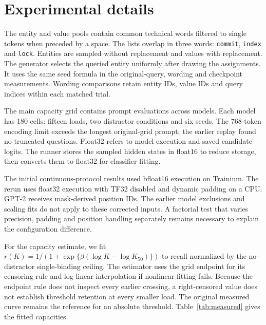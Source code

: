 \documentclass{article}
\begin{document}
\clearpage
\appendix
\section{Experimental details}\label{app:protocol}
The entity and value pools contain common technical words filtered to single tokens when preceded by a space.
The lists overlap in three words: \texttt{commit}, \texttt{index} and \texttt{lock}.
Entities are sampled without replacement and values with replacement.
The generator selects the queried entity uniformly after drawing the assignments.
It uses the same seed formula in the original-query, wording and checkpoint measurements.
Wording comparisons retain entity IDs, value IDs and query indices within each matched trial.

The main capacity grid contains \NewNPrompts{} prompt evaluations across \NewNModels{} models.
Each model has 180 cells: fifteen loads, two distractor conditions and six seeds.
The 768-token encoding limit exceeds the longest original-grid prompt; the earlier replay found no truncated questions.
Float32 refers to model execution and saved candidate logits.
The runner stores the sampled hidden states in float16 to reduce storage, then converts them to float32 for classifier fitting.

The initial continuous-protocol results used bfloat16 execution on Trainium.
The rerun uses float32 execution with TF32 disabled and dynamic padding on a CPU.
GPT-2 receives mask-derived position IDs.
The earlier model exclusions and scaling fits do not apply to these corrected inputs.
A factorial test that varies precision, padding and position handling separately remains necessary to explain the configuration difference.

For the capacity estimate, we fit
$r(K)=1/(1+\exp\{\beta(\log K-\log K_{50})\})$
to recall normalized by the no-distractor single-binding ceiling.
The estimator uses the grid endpoint for its censoring rule and log-linear interpolation if nonlinear fitting fails.
Because the endpoint rule does not inspect every earlier crossing, a right-censored value does not establish threshold retention at every smaller load.
The original measured curve remains the reference for an absolute threshold.
Table~\ref{tab:measured} gives the fitted capacities.

\begin{table}[t]
\centering
\caption{Corrected original-query measurements, with 576 trials per recall cell.
$p_0$ denotes recall without distractors; $p_D$ includes the code-like block.
Both fitted capacities normalize by $p_0(1)$.
$>64$ denotes an endpoint above the normalized half-recall criterion; $\leq1$ denotes failure at the first grid point under the interpolation fallback.
Capacities are descriptive fit outputs, not estimates of an intrinsic storage limit.}
\label{tab:measured}
\small

\end{table}
\end{document}
